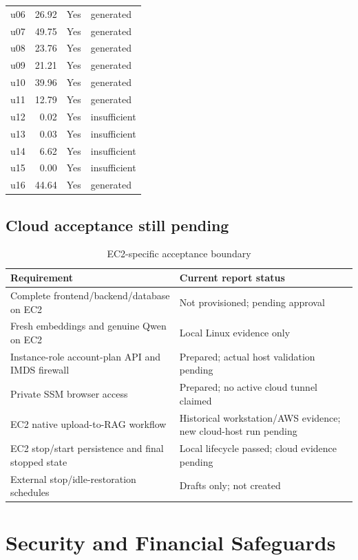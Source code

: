 \documentclass[11pt,a4paper,oneside]{report}
\begin{document}
\begin{longtable}{lrrl}
u06&26.92&Yes&generated\\
u07&49.75&Yes&generated\\
u08&23.76&Yes&generated\\
u09&21.21&Yes&generated\\
u10&39.96&Yes&generated\\
u11&12.79&Yes&generated\\
u12&0.02&Yes&insufficient\\
u13&0.03&Yes&insufficient\\
u14&6.62&Yes&insufficient\\
u15&0.00&Yes&insufficient\\
u16&44.64&Yes&generated\\
\bottomrule\end{longtable}
\section{Cloud acceptance still pending}
\par\begin{table}[htbp]\caption{EC2-specific acceptance boundary}\small\begin{tabularx}{\linewidth}{YY}\toprule Requirement&Current report status\\\midrule
Complete frontend/backend/database on EC2&Not provisioned; pending approval\\
Fresh embeddings and genuine Qwen on EC2&Local Linux evidence only\\
Instance-role account-plan API and IMDS firewall&Prepared; actual host validation pending\\
Private SSM browser access&Prepared; no active cloud tunnel claimed\\
EC2 native upload-to-RAG workflow&Historical workstation/AWS evidence; new cloud-host run pending\\
EC2 stop/start persistence and final stopped state&Local lifecycle passed; cloud evidence pending\\
External stop/idle-restoration schedules&Drafts only; not created\\\bottomrule\end{tabularx}\end{table}\par
\chapter{Security and Financial Safeguards}
\footnotesize
\end{document}
